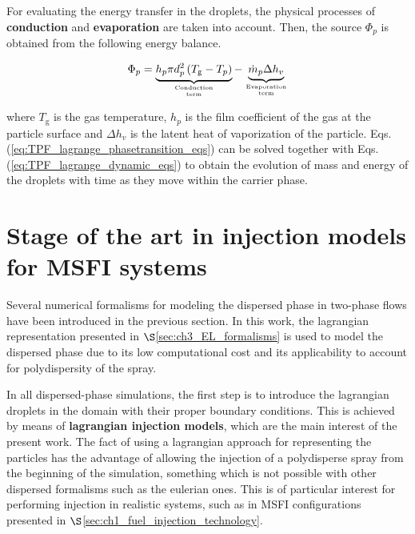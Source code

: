 For evaluating the energy transfer in the droplets, the physical processes of \textbf{conduction} and  \textbf{evaporation} are taken into account. Then, the source $\Phi_p$ is obtained from the following energy balance.

\begin{equation}
\Phi_p = \underbrace{ h_p \pi d_p^2 \left( T_\mathrm{g} - T_p \right) }_{\text{Conduction}\atop\text{term}} - \underbrace{ \dot{m}_p  \Delta h_v }_{\text{Evaporation}\atop\text{term}}
\end{equation}

where $T_\mathrm{g}$ is the gas temperature, $h_p$ is the film coefficient of the gas at the particle surface and $\Delta h_v$ is the latent heat of vaporization of the particle. Eqs. (\ref{eq:TPF_lagrange_phasetransition_eqs}) can be solved together with Eqs. (\ref{eq:TPF_lagrange_dynamic_eqs}) to obtain the evolution of mass and energy of the droplets with time as they move within the carrier phase.

\section{Stage of the art in injection models for MSFI systems}
\label{sec:ch3_state_art_lagrangian_injection}

Several numerical formalisms for modeling the dispersed phase in two-phase flows have been introduced in the previous section. In this work, the lagrangian representation presented in $\S$\ref{sec:ch3_EL_formalisms} is used to model the dispersed phase due to its low computational cost and its applicability to account for polydispersity of the spray.%

In all dispersed-phase simulations, the first step is to introduce the lagrangian droplets in the domain with their proper boundary conditions. This is achieved by means of \textbf{lagrangian injection models}, which are the main interest of the present work. The fact of using a lagrangian approach for representing the particles has the advantage of allowing the injection of a polydisperse spray from the beginning of the simulation, something which is not possible with other dispersed formalisms such as the eulerian ones. This is of particular interest for performing injection in realistic systems, such as in MSFI configurations presented in $\S$\ref{sec:ch1_fuel_injection_technology}. 

